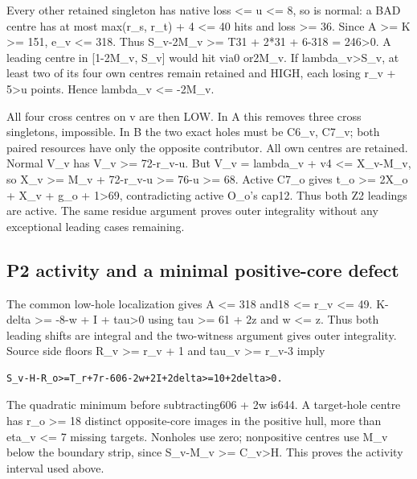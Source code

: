 \documentclass[11pt,a4paper]{article}
\begin{document}
Every other retained singleton has native loss \textless= u \textless=
8, so is normal: a BAD centre has at most max(r\_s, r\_t) + 4 \textless=
40 hits and loss \textgreater= 36. Since A \textgreater= K \textgreater=
151, e\_v \textless= 318. Thus S\_v-2M\_v \textgreater= T31 + 2*31 +
6-318 = 246\textgreater0. A leading centre in {[}1-2M\_v, S\_v{]} would
hit via0 or2M\_v. If lambda\_v\textgreater S\_v, at least two of its
four own centres remain retained and HIGH, each losing r\_v +
5\textgreater u points. Hence lambda\_v \textless= -2M\_v.

All four cross centres on v are then LOW. In A this removes three cross
singletons, impossible. In B the two exact holes must be C6\_v, C7\_v;
both paired resources have only the opposite contributor. All own
centres are retained. Normal V\_v has V\_v \textgreater= 72-r\_v-u. But
V\_v = lambda\_v + v4 \textless= X\_v-M\_v, so X\_v \textgreater= M\_v +
72-r\_v-u \textgreater= 76-u \textgreater= 68. Active C7\_o gives t\_o
\textgreater= 2X\_o + X\_v + g\_o + 1\textgreater69, contradicting
active O\_o's cap12. Thus both Z2 leadings are active. The same residue
argument proves outer integrality without any exceptional leading cases
remaining.

\hypertarget{p2-activity-and-a-minimal-positive-core-defect}{%
\subsection{P2 activity and a minimal positive-core
defect}\label{p2-activity-and-a-minimal-positive-core-defect}}

The common low-hole localization gives A \textless= 318 and18 \textless=
r\_v \textless= 49. K-delta \textgreater= -8-w + I + tau\textgreater0
using tau \textgreater= 61 + 2z and w \textless= z. Thus both leading
shifts are integral and the two-witness argument gives outer
integrality. Source side floors R\_v \textgreater= r\_v + 1 and tau\_v
\textgreater= r\_v-3 imply

\begin{verbatim}
S_v-H-R_o>=T_r+7r-606-2w+2I+2delta>=10+2delta>0.
\end{verbatim}

The quadratic minimum before subtracting606 + 2w is644. A target-hole
centre has r\_o \textgreater= 18 distinct opposite-core images in the
positive hull, more than eta\_v \textless= 7 missing targets. Nonholes
use zero; nonpositive centres use M\_v below the boundary strip, since
S\_v-M\_v \textgreater= C\_v\textgreater H. This proves the activity
interval used above.
\end{document}
